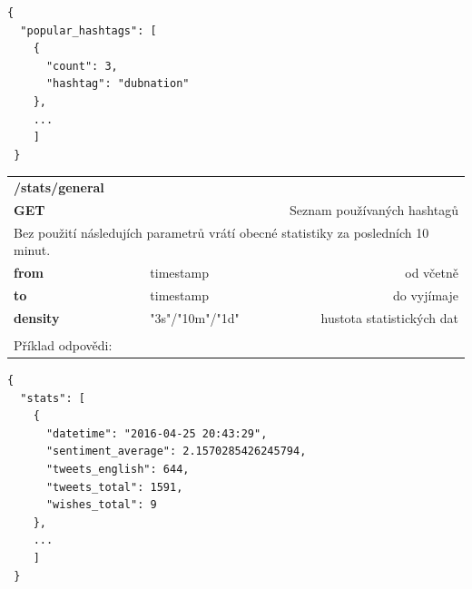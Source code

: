 \documentclass[thesis=B,czech]{FITthesis}[2012/06/26]
\begin{document}
\begin{lstlisting}[float=H]
 {
  "popular_hashtags": [
    {
      "count": 3,
      "hashtag": "dubnation"
    },
    ...
    ]
 }
\end{lstlisting} 


\begin{table}[h]
\begin{tabular}{llllr}
\rowcolor[HTML]{EFEFEF}
\large \textbf{/stats/general}        &         &                 &        & \multicolumn{1}{l}{}                \\
\rowcolor[HTML]{EFEFEF}
\textbf{GET}          &         &                 &        & Seznam používaných hashtagů                        \\
\multicolumn{5}{l}{\parbox[t]{12.8cm}{Bez použití následujích parametrů vrátí obecné statistiky za posledních 10 minut.  }  } \\
\textbf{from}         &         & timestamp       &        & od včetně                           \\
\textbf{to}           &         & timestamp       &        & do vyjímaje                         \\
\textbf{density}        &         & "3s"/"10m"/"1d"         &        & hustota statistických dat   \\
 & & & & \\
 Příklad odpovědi:   \\
\end{tabular}
\end{table}

\begin{lstlisting}[float=H]
 {
  "stats": [
    {
      "datetime": "2016-04-25 20:43:29",
      "sentiment_average": 2.1570285426245794,
      "tweets_english": 644,
      "tweets_total": 1591,
      "wishes_total": 9
    },
    ...
    ]
 }
\end{lstlisting}
\end{document}
